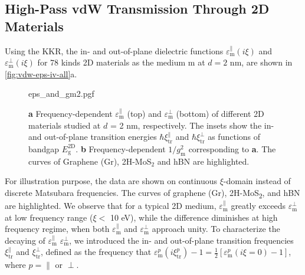 \subsection{High-Pass vdW Transmission Through 2D Materials}
\label{sec:vdw-high-pass-vdw}


%
Using the KKR, the in- and out-of-plane dielectric functions
$\varepsilon_{\mathrm{m}}^{\parallel}(i \xi)$ and
$\varepsilon_{\mathrm{m}}^{\perp}(i \xi)$ for 78 kinds 2D
materials as the medium m at $d=2$ nm, are
shown in \autoref{fig:vdw-eps-iv-all}a.
%

\begin{figure}[!htbp]
  \centering
  {eps_and_gm2.pgf}
  \caption{\label{fig:vdw-eps-iv-all} %
    {\bfseries a} Frequency-dependent
    $\varepsilon_{\mathrm{m}}^{\parallel}$ (top) and
    $\varepsilon_{\mathrm{m}}^{\perp}$ (bottom) of different 2D
    materials studied at $d$ = 2 nm, respectively. The insets show the
    in- and out-of-plane transition energies
    $\hbar \xi_{\mathrm{tr}}^{\parallel}$ and
    $\hbar \xi_{\mathrm{tr}}^{\perp}$ as functions of bandgap
    $E_{\mathrm{g}}^{\mathrm{2D}}$. {\bfseries b} Frequency-dependent
    $1/g_{\mathrm{m}}^{2}$ corresponding to {\bfseries a}. The curves
    of Graphene (Gr), 2H-MoS$_{2}$ and hBN are highlighted. %
  }
\end{figure}
For illustration purpose, the data are shown on continuous
$\xi$-domain instead of discrete Matsubara frequencies.
%
The
curves of graphene (Gr), 2H-MoS\textsubscript{2}, and hBN are
highlighted.
%
We observe that for a typical 2D medium,
\(\varepsilon_{\mathrm{m}}^{\parallel}\) greatly exceeds
\(\varepsilon_{\mathrm{m}}^{\perp}\) at low frequency range ($\xi <$
10 eV), while the difference diminishes at high frequency regime, when
both $\varepsilon_{\mathrm{m}}^{\parallel}$ and
$\varepsilon_{\mathrm{m}}^{\perp}$ approach unity.
%
To characterize the decaying of $\varepsilon_{\mathrm{m}}^{\parallel}$ $\varepsilon_{\mathrm{m}}^{\perp}$, we introduced the in- and
out-of-plane transition frequencies \(\xi_{\mathrm{tr}}^{\parallel}\)
and \(\xi_{\mathrm{tr}}^{\perp}\), defined as the frequency that
\(\varepsilon_{\mathrm{m}}^{p}(i \xi^{p}_{\mathrm{tr}}) - 1 =
\frac{1}{2}[\varepsilon_{\mathrm{m}}^{p}(i\xi=0) - 1]\), where
$p=\parallel$ or $\perp$.
%

